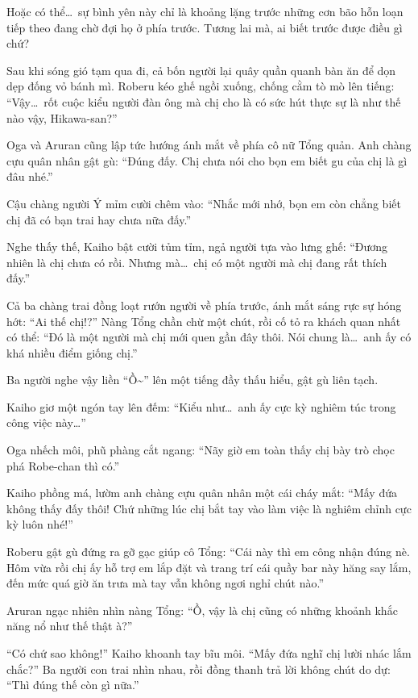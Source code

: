 \documentclass[../main.tex]{subfiles}
\begin{document}
Hoặc có thể\dots\ sự bình yên này chỉ là khoảng lặng trước những cơn bão hỗn loạn tiếp theo đang chờ đợi họ ở phía trước. Tương lai mà, ai biết trước được điều gì chứ?

\omk

Sau khi sóng gió tạm qua đi, cả bốn người lại quây quần quanh bàn ăn để dọn dẹp đống vỏ bánh mì. Roberu kéo ghế ngồi xuống, chống cằm tò mò lên tiếng: ``Vậy\dots\ rốt cuộc kiểu người đàn ông mà chị cho là có sức hút thực sự là như thế nào vậy, Hikawa-san?''

Oga và Aruran cũng lập tức hướng ánh mắt về phía cô nữ Tổng quản. Anh chàng cựu quân nhân gật gù: ``Đúng đấy. Chị chưa nói cho bọn em biết gu của chị là gì đâu nhé.''

Cậu chàng người Ý mỉm cười chêm vào: ``Nhắc mới nhớ, bọn em còn chẳng biết chị đã có bạn trai hay chưa nữa đấy.''

Nghe thấy thế, Kaiho bật cười tủm tỉm, ngả người tựa vào lưng ghế: ``Đương nhiên là chị chưa có rồi. Nhưng mà\dots\ chị có một người mà chị đang rất thích đấy.''

Cả ba chàng trai đồng loạt rướn người về phía trước, ánh mắt sáng rực sự hóng hớt: ``Ai thế chị!?'' Nàng Tổng chần chừ một chút, rồi cố tỏ ra khách quan nhất có thể: ``Đó là một người mà chị mới quen gần đây thôi. Nói chung là\dots\ anh ấy có khá nhiều điểm giống chị.''

Ba người nghe vậy liền ``Ồ\~{}'' lên một tiếng đầy thấu hiểu, gật gù liên tạch.

Kaiho giơ một ngón tay lên đếm: ``Kiểu như\dots\ anh ấy cực kỳ nghiêm túc trong công việc này\dots''

Oga nhếch môi, phũ phàng cắt ngang: ``Nãy giờ em toàn thấy chị bày trò chọc phá Robe-chan thì có.''

Kaiho phồng má, lườm anh chàng cựu quân nhân một cái cháy mắt: ``Mấy đứa không thấy đấy thôi! Chứ những lúc chị bắt tay vào làm việc là nghiêm chỉnh cực kỳ luôn nhé!''

Roberu gật gù đứng ra gỡ gạc giúp cô Tổng: ``Cái này thì em công nhận đúng nè. Hôm vừa rồi chị ấy hỗ trợ em lắp đặt và trang trí cái quầy bar này hăng say lắm, đến mức quá giờ ăn trưa mà tay vẫn không ngơi nghỉ chút nào.''

Aruran ngạc nhiên nhìn nàng Tổng: ``Ồ, vậy là chị cũng có những khoảnh khắc năng nổ như thế thật à?''

``Có chứ sao không!'' Kaiho khoanh tay bĩu môi. ``Mấy đứa nghĩ chị lười nhác lắm chắc?'' Ba người con trai nhìn nhau, rồi đồng thanh trả lời không chút do dự: ``Thì đúng thế còn gì nữa.''
\end{document}
